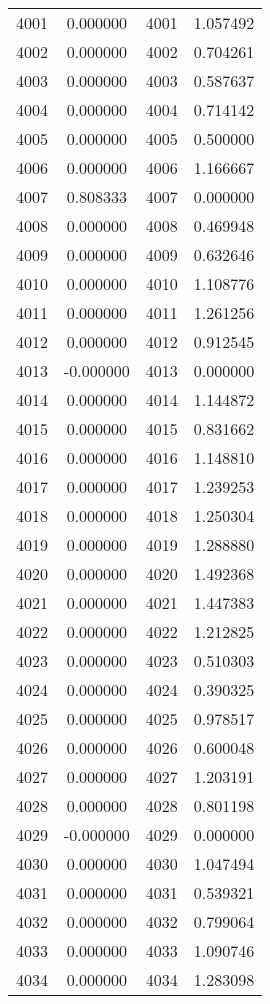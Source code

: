 \documentclass[12pt]{article}
\begin{document}
\begin{longtable}{@{}cccc@{}}
4001 & 0.000000 & 4001 & 1.057492 \\
4002 & 0.000000 & 4002 & 0.704261 \\
4003 & 0.000000 & 4003 & 0.587637 \\
4004 & 0.000000 & 4004 & 0.714142 \\
4005 & 0.000000 & 4005 & 0.500000 \\
4006 & 0.000000 & 4006 & 1.166667 \\
4007 & 0.808333 & 4007 & 0.000000 \\
4008 & 0.000000 & 4008 & 0.469948 \\
4009 & 0.000000 & 4009 & 0.632646 \\
4010 & 0.000000 & 4010 & 1.108776 \\
4011 & 0.000000 & 4011 & 1.261256 \\
4012 & 0.000000 & 4012 & 0.912545 \\
4013 & -0.000000 & 4013 & 0.000000 \\
4014 & 0.000000 & 4014 & 1.144872 \\
4015 & 0.000000 & 4015 & 0.831662 \\
4016 & 0.000000 & 4016 & 1.148810 \\
4017 & 0.000000 & 4017 & 1.239253 \\
4018 & 0.000000 & 4018 & 1.250304 \\
4019 & 0.000000 & 4019 & 1.288880 \\
4020 & 0.000000 & 4020 & 1.492368 \\
4021 & 0.000000 & 4021 & 1.447383 \\
4022 & 0.000000 & 4022 & 1.212825 \\
4023 & 0.000000 & 4023 & 0.510303 \\
4024 & 0.000000 & 4024 & 0.390325 \\
4025 & 0.000000 & 4025 & 0.978517 \\
4026 & 0.000000 & 4026 & 0.600048 \\
4027 & 0.000000 & 4027 & 1.203191 \\
4028 & 0.000000 & 4028 & 0.801198 \\
4029 & -0.000000 & 4029 & 0.000000 \\
4030 & 0.000000 & 4030 & 1.047494 \\
4031 & 0.000000 & 4031 & 0.539321 \\
4032 & 0.000000 & 4032 & 0.799064 \\
4033 & 0.000000 & 4033 & 1.090746 \\
4034 & 0.000000 & 4034 & 1.283098 \\

\end{longtable}
\end{document}
